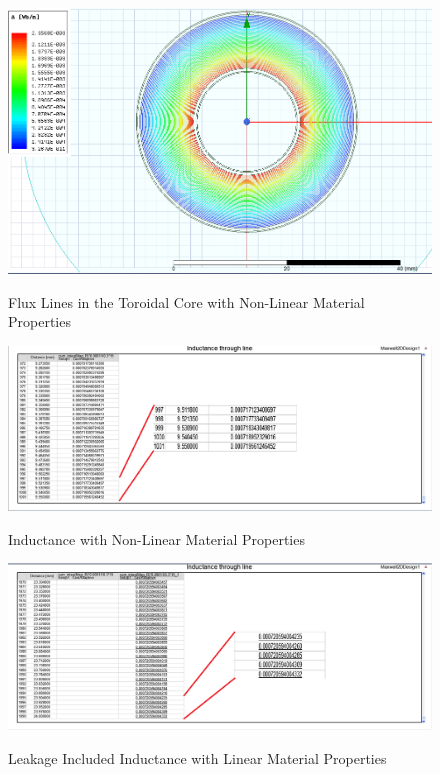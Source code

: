 \begin{enumerate}
\begin{figure}[H]
\hspace{1.5cm}
\centering\includegraphics[width=4.5in]{flux_line_nonlinear.PNG}\\
\caption{Flux Lines in the Toroidal Core with Non-Linear Material Properties}
\label{flux2}
\end{figure} 

\begin{figure}[H]
\hspace{1.5cm}
\centering\includegraphics[width=4.5in]{nonlinear_inductance.PNG}\\
\caption{Inductance with Non-Linear Material Properties}
\label{ind2}
\end{figure}

\begin{figure}[H]
\hspace{1.5cm}
\centering\includegraphics[width=4.5in]{leakage.PNG}\\
\caption{Leakage Included Inductance with Linear Material Properties}
\label{leak1}
\end{figure} 



\end{enumerate}
